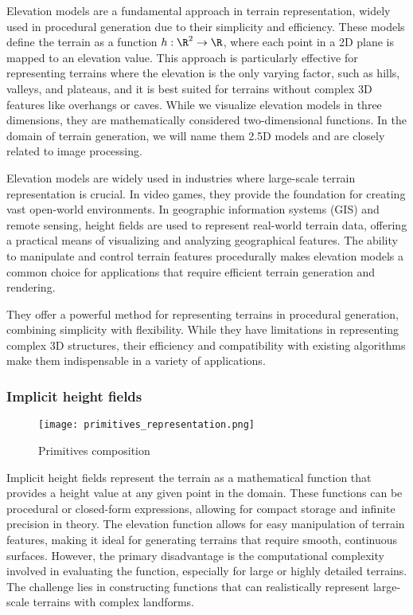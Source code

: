 Elevation models are a fundamental approach in terrain representation, widely used in procedural generation due to their simplicity and efficiency. These models define the terrain as a function $h : \R^2 \to \R$, where each point in a 2D plane is mapped to an elevation value. This approach is particularly effective for representing terrains where the elevation is the only varying factor, such as hills, valleys, and plateaus, and it is best suited for terrains without complex 3D features like overhangs or caves. While we visualize elevation models in three dimensions, they are mathematically considered two-dimensional functions. In the domain of terrain generation, we will name them 2.5D models and are closely related to image processing.

Elevation models are widely used in industries where large-scale terrain representation is crucial. In video games, they provide the foundation for creating vast open-world environments. In geographic information systems (GIS) and remote sensing, height fields are used to represent real-world terrain data, offering a practical means of visualizing and analyzing geographical features. The ability to manipulate and control terrain features procedurally makes elevation models a common choice for applications that require efficient terrain generation and rendering.

They offer a powerful method for representing terrains in procedural generation, combining simplicity with flexibility. While they have limitations in representing complex 3D structures, their efficiency and compatibility with existing algorithms make them indispensable in a variety of applications.

\subsubsection{Implicit height fields}

\begin{wrapfigure}{L}{0.4\textwidth}
    \texttt{[image: primitives\_representation.png]}
    \caption{Primitives composition}
    \label{fig:erosion-primitives-representation}
\end{wrapfigure}

Implicit height fields represent the terrain as a mathematical function that provides a height value at any given point in the domain. These functions can be procedural or closed-form expressions, allowing for compact storage and infinite precision in theory. The elevation function allows for easy manipulation of terrain features, making it ideal for generating terrains that require smooth, continuous surfaces. However, the primary disadvantage is the computational complexity involved in evaluating the function, especially for large or highly detailed terrains. The challenge lies in constructing functions that can realistically represent large-scale terrains with complex landforms.

